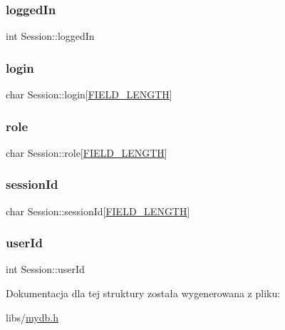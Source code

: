 \mbox{\label{structSession_aec3947444a960feec8c28bb8521d93eb}} 
\subsubsection{\texorpdfstring{loggedIn}{loggedIn}}
{\footnotesize\ttfamily int Session\+::logged\+In}

\mbox{\label{structSession_a1a923454d0b48a58292073de0b698cd0}} 
\subsubsection{\texorpdfstring{login}{login}}
{\footnotesize\ttfamily char Session\+::login\mbox{[}\mbox{\hyperlink{mydb_8h_a4e8ecaf2d59499a8c159ccdf7be1baec}{F\+I\+E\+L\+D\+\_\+\+L\+E\+N\+G\+TH}}\mbox{]}}

\mbox{\label{structSession_a748e8927620639e90e3ff3550d48b1ad}} 
\subsubsection{\texorpdfstring{role}{role}}
{\footnotesize\ttfamily char Session\+::role\mbox{[}\mbox{\hyperlink{mydb_8h_a4e8ecaf2d59499a8c159ccdf7be1baec}{F\+I\+E\+L\+D\+\_\+\+L\+E\+N\+G\+TH}}\mbox{]}}

\mbox{\label{structSession_a447ed28ff422953c1ba4b92caa5ce1a6}} 
\subsubsection{\texorpdfstring{sessionId}{sessionId}}
{\footnotesize\ttfamily char Session\+::session\+Id\mbox{[}\mbox{\hyperlink{mydb_8h_a4e8ecaf2d59499a8c159ccdf7be1baec}{F\+I\+E\+L\+D\+\_\+\+L\+E\+N\+G\+TH}}\mbox{]}}

\mbox{\label{structSession_ae5e2fb47376e2d06efcbe3a270bae496}} 
\subsubsection{\texorpdfstring{userId}{userId}}
{\footnotesize\ttfamily int Session\+::user\+Id}



Dokumentacja dla tej struktury została wygenerowana z pliku\+:\begin{DoxyCompactItemize}
\item 
libs/\mbox{\hyperlink{mydb_8h}{mydb.\+h}}\end{DoxyCompactItemize}
